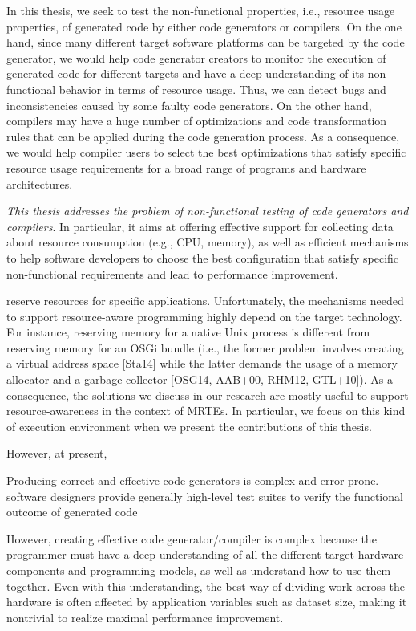 In this thesis, we seek to test the non-functional properties, i.e., resource usage properties, of generated code by either code generators or compilers. On the one hand, since many different target software platforms can be targeted by the code generator, we would help code generator creators to monitor the execution of generated code for different targets and have a deep understanding of its non-functional behavior in terms of resource usage. Thus, we can detect bugs and inconsistencies caused by some faulty code generators. On the other hand, compilers may have a huge number of optimizations and code transformation rules that can be applied during the code generation process. As a consequence, we would help compiler users to select the best optimizations that satisfy specific resource usage requirements for a broad range of programs and hardware architectures.

\textit{This thesis addresses the problem of non-functional testing of code generators and compilers}. In particular, it aims at offering effective support for collecting
data about resource consumption (e.g., CPU, memory), as well
as efficient mechanisms to help software developers to choose the best configuration that satisfy specific non-functional requirements and lead to performance improvement.

\iffalse
reserve resources for specific applications. Unfortunately,
the mechanisms needed to support resource-aware programming highly depend on the
target technology. For instance, reserving memory for a native Unix process is different
from reserving memory for an OSGi bundle (i.e., the former problem involves creating a
virtual address space [Sta14] while the latter demands the usage of a memory allocator
and a garbage collector [OSG14, AAB+00, RHM12, GTL+10]). As a consequence, the
solutions we discuss in our research are mostly useful to support resource-awareness in
the context of MRTEs. In particular, we focus on this kind of execution environment
when we present the contributions of this thesis.

 
 




However, at present, 

Producing correct and effective code generators is complex and error-prone. software designers provide generally high-level test suites to verify the functional outcome of generated code

However, creating effective code generator/compiler is complex because the programmer must have a deep understanding of all the different target hardware components and programming models, as well as understand how to use them together. Even with this understanding, the best way of dividing work
across the hardware is often affected by application variables such as dataset size, making it nontrivial to realize maximal performance improvement.

